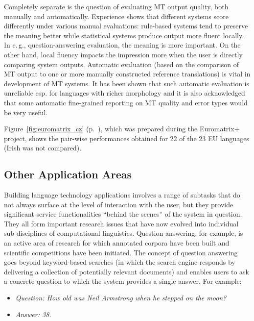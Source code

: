 \begin{multicols}{2}
Completely separate is the question of evaluating MT output quality, both manually and automatically. Experience shows that different systems score differently under various manual evaluations: rule-based systems tend to preserve the meaning better while statistical systems produce output more fluent locally. In e.\,g., question-answering evaluation, the meaning is more important. On the other hand, local fluency impacts the impression more when the user is directly comparing system outputs. Automatic evaluation (based on the comparison of MT output to one or more manually constructed reference translations) is vital in development of MT systems. It has been shown that such automatic evaluation is unreliable esp. for languages with richer morphology and it is also acknowledged that some automatic fine-grained reporting on MT quality and error types would be very useful.

Figure~\ref{fig:euromatrix_cz} (p.~\pageref{fig:euromatrix_cz}), which was prepared during the Euromatrix+ project, shows the pair-wise performances obtained for 22 of the 23 EU languages (Irish was not compared). %

\subsection{Other Application Areas}

Building language technology applications involves a range of subtasks that do not always surface at the level of interaction with the user, but they provide significant service functionalities “behind the scenes” of the system in question. They all form important research issues that have now evolved into individual sub-disciplines of computational linguistics. Question answering, for example, is an active area of research for which annotated corpora have been built and scientific competitions have been initiated. The concept of question answering goes beyond keyword-based searches (in which the search engine responds by delivering a collection of potentially relevant documents) and enables users to ask a concrete question to which the system provides a single answer. For example:

\begin{itemize}
\item[] \textit{Question: How old was Neil Armstrong when he stepped on the moon?}
\item[] \textit{Answer: 38.}
\end{itemize}


\end{multicols}
